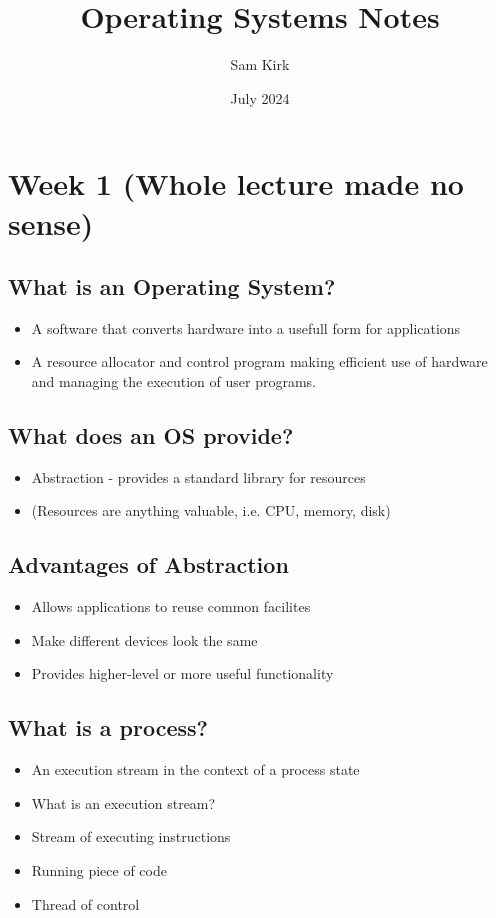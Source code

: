 \documentclass[12pt, letterpaper]{article}
\title{Operating Systems Notes}
\author{Sam Kirk}
\date{July 2024}
\begin{document}
\maketitle

\section*{Week 1 (Whole lecture made no sense)}
\subsection*{What is an Operating System?}
\begin{itemize}
    \item A software that converts hardware into a usefull form for applications 
    \item A resource allocator and control program making efficient use 
    of hardware and managing the execution of user programs. 
\end{itemize}
\subsection*{What does an OS provide?}
\begin{itemize}
    \item Abstraction - provides a standard library for resources
    \item (Resources are anything valuable, i.e. CPU, memory, disk)
\end{itemize}
\subsection*{Advantages of Abstraction}
\begin{itemize}
    \item Allows applications to reuse common facilites 
    \item Make different devices look the same 
    \item Provides higher-level or more useful functionality 
\end{itemize}
\subsection*{What is a process?}
\begin{itemize}
    \item An execution stream in the context of a process state 
    \item What is an execution stream?
    \item Stream of executing instructions 
    \item Running piece of code 
    \item Thread of control 
\end{itemize}
\end{document}
